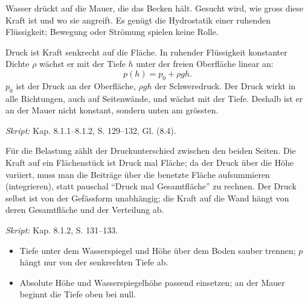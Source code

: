 
Wasser drückt auf die Mauer, die das Becken hält. Gesucht wird, wie gross
diese Kraft ist und wo sie angreift. Es genügt die Hydrostatik einer ruhenden
Flüssigkeit; Bewegung oder Strömung spielen keine Rolle.

\begin{werkzeugkasten}
Druck ist Kraft senkrecht auf die Fläche. In ruhender Flüssigkeit konstanter
Dichte $\rho$ wächst er mit der Tiefe $h$ unter der freien Oberfläche linear an:
\begin{equation}
  p(h)=p_0+\rho gh.
\end{equation}
$p_0$ ist der Druck an der Oberfläche, $\rho gh$ der Schweredruck. Der Druck
wirkt in alle Richtungen, auch auf Seitenwände, und wächst mit der Tiefe.
Deshalb ist er an der Mauer nicht konstant, sondern unten am grössten.

\textit{Skript:} Kap. 8.1.1--8.1.2, S. 129--132, Gl. (8.4).
\end{werkzeugkasten}

\begin{werkzeugkasten}
Für die Belastung zählt der Druckunterschied zwischen den beiden Seiten. Die
Kraft auf ein Flächenstück ist Druck mal Fläche; da der Druck über die Höhe
variiert, muss man die Beiträge über die benetzte Fläche aufsummieren
(integrieren), statt pauschal ``Druck mal Gesamtfläche'' zu rechnen. Der
Druck selbst ist von der Gefässform unabhängig; die Kraft auf die Wand hängt
von deren Gesamtfläche und der Verteilung ab.

\textit{Skript:} Kap. 8.1.2, S. 131--133.
\end{werkzeugkasten}

\begin{achtung}
\begin{itemize}
  \item Tiefe unter dem Wasserspiegel und Höhe über dem Boden sauber trennen;
        $p$ hängt nur von der senkrechten Tiefe ab.
  \item Absolute Höhe und Wasserspiegelhöhe passend einsetzen; an der Mauer
        beginnt die Tiefe oben bei null.
\end{itemize}
\end{achtung}

